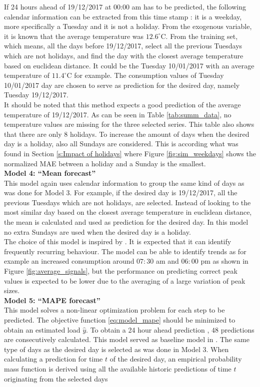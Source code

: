 If 24 hours ahead of 19/12/2017 at 00:00 am has to be predicted, the following calendar information can be extracted from this time stamp : it is a weekday, more specifically a Tuesday and it is not a holiday. From the exogenous variable, it is known that the average temperature was $12.6^\circ$C. From the training set, which means, all the days before 19/12/2017, select all the previous Tuesdays which are not holidays, and find the day with the closest average temperature based on euclidean distance. It could be the Tuesday 10/01/2017 with an average temperature of $11.4^\circ$C for example. The consumption values of Tuesday 10/01/2017 day are chosen to serve as prediction for the desired day, namely Tuesday 19/12/2017.\\ 
It should be noted that this method expects a good prediction of the average temperature of 19/12/2017. As can be seen in Table \ref{tab:summ_data}, no temperature values are missing for the three selected series. This table also shows that there are only  $ 8 $ holidays. To increase the amount of days when the desired day is a holiday, also all Sundays are considered. This is according what was found in Section \ref{s:Impact of holidays} where Figure \ref{fig:sim_weekdays} shows the normalized MAE between a holiday and a Sunday is the smallest. \\

  
 \textbf{Model 4: ``Mean forecast''}\\
 This model again uses calendar information to group the same kind of days as was done for Model 3. For example, if the desired day is 19/12/2017, all the previous Tuesdays which are not holidays, are selected. Instead of looking to the most similar day based on the closest average temperature in euclidean distance, the mean is calculated and used as prediction for the desired day. In this model no extra Sundays are used when the desired day is a holiday.\\
The choice of this model is inspired by \cite{Kong2019}. It is expected that it can identify frequently recurring behaviour. The model can be able to identify trends as for example an increased consumption around $ 07:30 $ am and $ 06:00 $ pm as shown in Figure \ref{fig:average_signals}, but the performance on predicting correct peak values is expected to be lower due to the averaging of a large variation of peak sizes.\\
 
 \textbf{Model 5: ``MAPE forecast'' }\\
 This model solves a non-linear optimization problem for each step to be predicted. The objective function \ref{eq:model_mape} should be minimized to obtain an estimated load $ \hat{y} $. To obtain a 24 hour ahead prediction , $ 48  $ predictions are consecutively calculated. This model served as baseline model in \cite{Kong2019}. The same type of days as the desired day is selected as was done in Model 3. When calculating a prediction for time $ t $ of the desired day, an empirical probability mass function is derived using all the available historic predictions of time $ t $ originating from the selected days
 
